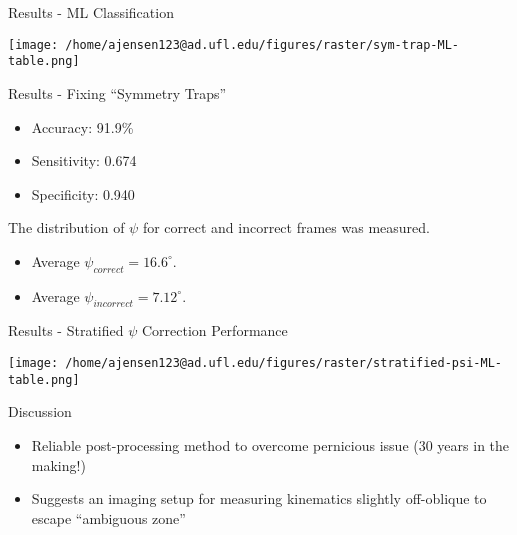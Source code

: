 \documentclass[presentation, aspectratio=1610]{beamer}
\begin{document}
\begin{frame}[label={sec:org49a2fcc}]{Results - ML Classification}
\begin{center}
\texttt{[image: /home/ajensen123@ad.ufl.edu/figures/raster/sym-trap-ML-table.png]}
\end{center}
\end{frame}
\begin{frame}[label={sec:orgc78a4c4}]{Results - Fixing ``Symmetry Traps''}
\begin{itemize}
\item Accuracy: 91.9\%
\item Sensitivity: 0.674
\item Specificity: 0.940
\end{itemize}

The distribution of \(\psi\) for correct and incorrect frames was measured.
\begin{itemize}
\item Average \(\psi_{correct}=16.6^{\circ}\).
\item Average \(\psi_{incorrect} = 7.12^{\circ}\).
\end{itemize}
\end{frame}
\begin{frame}[label={sec:org20fcd06}]{Results - Stratified \(\psi\) Correction Performance}
\begin{center}
\texttt{[image: /home/ajensen123@ad.ufl.edu/figures/raster/stratified-psi-ML-table.png]}
\end{center}
\end{frame}
\begin{frame}[label={sec:orgaf6b91a}]{Discussion}
\begin{itemize}
\item Reliable post-processing method to overcome pernicious issue (30 years in the making!)
\item Suggests an imaging setup for measuring kinematics slightly off-oblique to escape ``ambiguous zone''
\end{itemize}
\end{frame}
\end{document}
